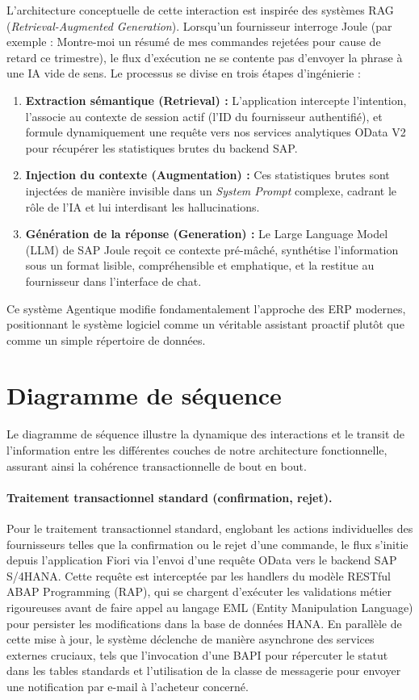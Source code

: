 \documentclass[12pt,a4paper,oneside]{report}
\begin{document}
L'architecture conceptuelle de cette interaction est inspirée des systèmes RAG (\textit{Retrieval-Augmented Generation}). Lorsqu'un fournisseur interroge Joule (par exemple : \og Montre-moi un résumé de mes commandes rejetées pour cause de retard ce trimestre\fg{}), le flux d'exécution ne se contente pas d'envoyer la phrase à une IA vide de sens. Le processus se divise en trois étapes d'ingénierie :
\begin{enumerate}
    \item \textbf{Extraction sémantique (Retrieval) :} L'application intercepte l'intention, l'associe au contexte de session actif (l'ID du fournisseur authentifié), et formule dynamiquement une requête vers nos services analytiques OData V2 pour récupérer les statistiques brutes du backend SAP.
    \item \textbf{Injection du contexte (Augmentation) :} Ces statistiques brutes sont injectées de manière invisible dans un \textit{System Prompt} complexe, cadrant le rôle de l'IA et lui interdisant les hallucinations.
    \item \textbf{Génération de la réponse (Generation) :} Le Large Language Model (LLM) de SAP Joule reçoit ce contexte pré-mâché, synthétise l'information sous un format lisible, compréhensible et emphatique, et la restitue au fournisseur dans l'interface de chat.
\end{enumerate}
Ce système \og Agentique\fg{} modifie fondamentalement l'approche des ERP modernes, positionnant le système logiciel comme un véritable assistant proactif plutôt que comme un simple répertoire de données.

\section{Diagramme de séquence}\label{ch4:diag-sequences-fig}

Le diagramme de séquence illustre la dynamique des interactions et le transit de l'information entre les différentes couches de notre architecture fonctionnelle, assurant ainsi la cohérence transactionnelle de bout en bout.

\paragraph{Traitement transactionnel standard (confirmation, rejet).} Pour le traitement transactionnel standard, englobant les actions individuelles des fournisseurs telles que la confirmation ou le rejet d'une commande, le flux s'initie depuis l'application Fiori via l'envoi d'une requête OData vers le backend SAP S/4HANA. Cette requête est interceptée par les handlers du modèle RESTful ABAP Programming (RAP), qui se chargent d'exécuter les validations métier rigoureuses avant de faire appel au langage EML (Entity Manipulation Language) pour persister les modifications dans la base de données HANA. En parallèle de cette mise à jour, le système déclenche de manière asynchrone des services externes cruciaux, tels que l'invocation d'une BAPI pour répercuter le statut dans les tables standards et l'utilisation de la classe de messagerie pour envoyer une notification par e-mail à l'acheteur concerné.
\end{document}
